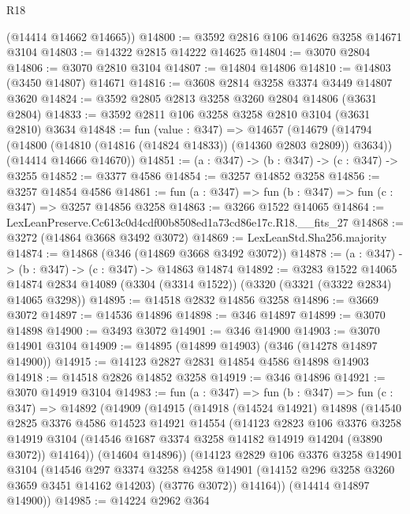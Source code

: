 \begin{lexlean}{R18}
\begin{coremodule}
      (@14414 @14662 @14665))
@14800 := @3592 @2816 @106 @14626 @3258 @14671 @3104
@14803 := @14322 @2815 @14222 @14625
@14804 := @3070 @2804
@14806 := @3070 @2810 @3104
@14807 := @14804 @14806
@14810 := @14803 (@3450 @14807) @14671
@14816 := @3608 @2814 @3258 @3374 @3449 @14807 @3620
@14824 := @3592 @2805 @2813 @3258 @3260 @2804 @14806 (@3631 @2804)
@14833 := @3592 @2811 @106 @3258 @3258 @2810 @3104 (@3631 @2810) @3634
@14848 := fun (value : @347) =>
  @14657
    (@14679
      (@14794 (@14800 (@14810 (@14816 (@14824 @14833)) (@14360 @2803 @2809)) @3634))
      (@14414 @14666 @14670))
@14851 := (a : @347) -> (b : @347) -> (c : @347) -> @3255
@14852 := @3377 @4586
@14854 := @3257 @14852 @3258
@14856 := @3257 @14854 @4586
@14861 := fun (a : @347) => fun (b : @347) => fun (c : @347) => @3257 @14856 @3258
@14863 := @3266 @1522 @14065
@14864 := LexLeanPreserve.Cc613c0d4cdf00b8508ed1a73cd86e17c.R18.__fits_27
@14868 := @3272 (@14864 @3668 @3492 @3072)
@14869 := LexLeanStd.Sha256.majority
@14874 := @14868 (@346 (@14869 @3668 @3492 @3072))
@14878 := (a : @347) -> (b : @347) -> (c : @347) -> @14863 @14874
@14892 := @3283
    @1522
    @14065
    @14874
    @2834
    @14089
    (@3304 (@3314 @1522))
    (@3320 (@3321 (@3322 @2834) @14065 @3298))
@14895 := @14518 @2832 @14856 @3258
@14896 := @3669 @3072
@14897 := @14536 @14896
@14898 := @346 @14897
@14899 := @3070 @14898
@14900 := @3493 @3072
@14901 := @346 @14900
@14903 := @3070 @14901 @3104
@14909 := @14895 (@14899 @14903) (@346 (@14278 @14897 @14900))
@14915 := @14123 @2827 @2831 @14854 @4586 @14898 @14903
@14918 := @14518 @2826 @14852 @3258
@14919 := @346 @14896
@14921 := @3070 @14919 @3104
@14983 := fun (a : @347) =>
  fun (b : @347) =>
  fun (c : @347) =>
  @14892
    (@14909
      (@14915
        (@14918
          (@14524 @14921)
          @14898
          (@14540
            @2825
            @3376
            @4586
            @14523
            @14921
            @14554
            (@14123
              @2823
              @106
              @3376
              @3258
              @14919
              @3104
              (@14546 @1687 @3374 @3258 @14182 @14919 @14204 (@3890 @3072))
              @14164))
          (@14604 @14896))
        (@14123
          @2829
          @106
          @3376
          @3258
          @14901
          @3104
          (@14546
            @297
            @3374
            @3258
            @4258
            @14901
            (@14152 @296 @3258 @3260 @3659 @3451 @14162 @14203)
            (@3776 @3072))
          @14164))
      (@14414 @14897 @14900))
@14985 := @14224 @2962 @364

\end{coremodule}
\end{lexlean}
